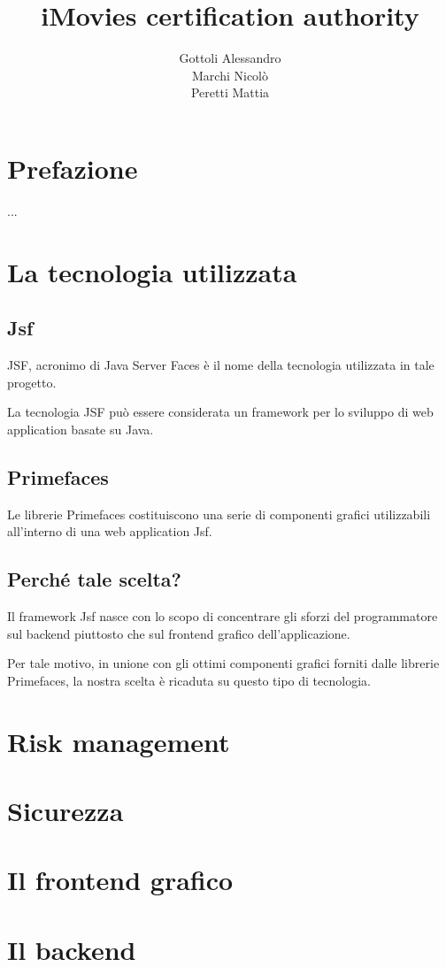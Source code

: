 \documentclass[a4paper,11pt]{book}
\title{iMovies certification authority}
\author{Gottoli Alessandro\\Marchi Nicolò\\Peretti Mattia}
\begin{document}
\maketitle
\tableofcontents

\chapter*{Prefazione}
...

\chapter{La tecnologia utilizzata}
\section{Jsf}
JSF, acronimo di Java Server Faces è il nome della tecnologia utilizzata in tale progetto.

La tecnologia JSF può essere considerata un framework per lo sviluppo di web application basate su Java.

\section{Primefaces}
Le librerie Primefaces costituiscono una serie di componenti grafici utilizzabili all'interno di una web application Jsf.

\section{Perché tale scelta?}
Il framework Jsf nasce con lo scopo di concentrare gli sforzi del programmatore sul backend piuttosto che sul frontend grafico dell'applicazione.

Per tale motivo, in unione con gli ottimi componenti grafici forniti dalle librerie Primefaces, la nostra scelta è ricaduta su questo tipo di tecnologia.

\chapter{Risk management}

\chapter{Sicurezza}

\chapter{Il frontend grafico}

\chapter{Il backend}
\end{document}
